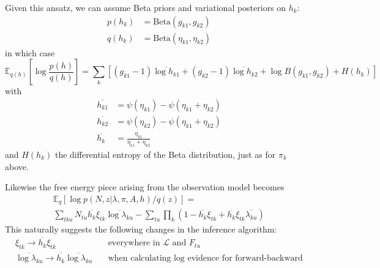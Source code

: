 \documentclass[11pt]{article}
\begin{document}
Given this ansatz, we can assume Beta priors and variational posteriors on $h_k$:
\begin{align}
    p(h_k) &= \mathrm{Beta}(g_{k1}, g_{k2}) \\
    q(h_k) &= \mathrm{Beta}(\eta_{k1}, \eta_{k2})
\end{align}
in which case 
\begin{equation}
    \mathbb{E}_{q(h)}\left[\log \frac{p(h)}{q(h)} \right] = \sum_k 
    \left[ (g_{k1} - 1) \overline{\log h_{k1}} + (g_{k2} - 1) \overline{\log h_{k2}} + \log B(g_{k1}, g_{k2}) + H(h_k) \right] 
\end{equation}
with
\begin{align}
    \overline{h_{k1}} &= \psi(\eta_{k1}) - \psi(\eta_{k1} + \eta_{k2}) \\
    \overline{h_{k2}} &= \psi(\eta_{k2}) - \psi(\eta_{k1} + \eta_{k2}) \\
    \overline{h_k} &= \frac{\eta_{k1}}{\eta_{k1} + \eta_{k2}}
\end{align}
and $H(h_k)$ the differential entropy of the Beta distribution, just as for $\pi_k$ above.

Likewise the free energy piece arising from the observation model becomes
\begin{multline}
    \mathbb{E}_q\left[ \log p(N, z|\lambda, \pi, A, h) / q(z) \right] = \\
    \sum_{tku} N_{tu} \overline{h_k} \xi_{tk} \overline{\log \lambda_{ku}} - 
    \sum_{tu} \prod_k \left( 1 - \overline{h_k} \xi_{tk} + \overline{h_k}\xi_{tk} \overline{\lambda_{ku}}\right)
\end{multline}
This naturally suggests the following changes in the inference algorithm:
\begin{align}
    \xi_{tk} \rightarrow \overline{h_k}\xi_{tk} \quad
    &\text{everywhere in $\mathcal{L}$ and $F_{tu}$}\\
    \overline{\log \lambda_{ku}} \rightarrow 
    \overline{h_k}\overline{\log \lambda_{ku}} \quad 
    &\text{when calculating log evidence for forward-backward} 
\end{align}
\end{document}
